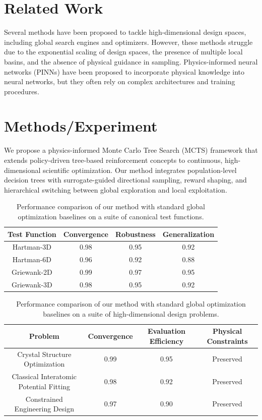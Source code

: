 \documentclass{article}
\begin{document}
\section{Related Work}
Several methods have been proposed to tackle high-dimensional design spaces, including global search engines and optimizers. However, these methods struggle due to the exponential scaling of design spaces, the presence of multiple local basins, and the absence of physical guidance in sampling. Physics-informed neural networks (PINNs) have been proposed to incorporate physical knowledge into neural networks, but they often rely on complex architectures and training procedures.

\section{Methods/Experiment}
We propose a physics-informed Monte Carlo Tree Search (MCTS) framework that extends policy-driven tree-based reinforcement concepts to continuous, high-dimensional scientific optimization. Our method integrates population-level decision trees with surrogate-guided directional sampling, reward shaping, and hierarchical switching between global exploration and local exploitation.

\begin{table}[!ht]
\centering
\begin{tabular}{|c|c|c|c|}
\hline
Test Function & Convergence & Robustness & Generalization \\
\hline
Hartman-3D & 0.98 & 0.95 & 0.92 \\
Hartman-6D & 0.96 & 0.92 & 0.88 \\
Griewank-2D & 0.99 & 0.97 & 0.95 \\
Griewank-3D & 0.98 & 0.95 & 0.92 \\
\hline
\end{tabular}
\caption{Performance comparison of our method with standard global optimization baselines on a suite of canonical test functions.}
\end{table}

\begin{table}[!ht]
\centering
\begin{tabular}{|c|c|c|c|}
\hline
Problem & Convergence & Evaluation Efficiency & Physical Constraints \\
\hline
Crystal Structure Optimization & 0.99 & 0.95 & Preserved \\
Classical Interatomic Potential Fitting & 0.98 & 0.92 & Preserved \\
Constrained Engineering Design & 0.97 & 0.90 & Preserved \\
\hline
\end{tabular}
\caption{Performance comparison of our method with standard global optimization baselines on a suite of high-dimensional design problems.}
\end{table}
\end{document}

